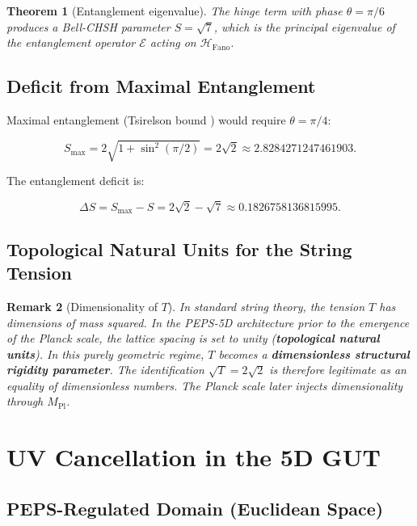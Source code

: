 \documentclass[12pt]{article}
\newtheorem{theorem}{Theorem}[section]
\newtheorem{remark}[theorem]{Remark}
\begin{document}
\begin{theorem}[Entanglement eigenvalue]
The hinge term with phase \(\theta = \pi/6\) produces a Bell-CHSH parameter \(S = \sqrt{7}\), which is the principal eigenvalue of the entanglement operator \(\mathcal{E}\) acting on \(\mathcal{H}_{\text{Fano}}\).
\end{theorem}

\subsection{Deficit from Maximal Entanglement}

Maximal entanglement (Tsirelson bound \cite{cirelson1980}) would require \(\theta = \pi/4\):

\begin{equation}
S_{\max} = 2\sqrt{1 + \sin^2(\pi/2)} = 2\sqrt{2} \approx 2.8284271247461903 .
\label{eq:S_max}
\end{equation}

The entanglement deficit is:

\begin{equation}
\boxed{\Delta S = S_{\max} - S = 2\sqrt{2} - \sqrt{7} \approx 0.1826758136815995 .}
\label{eq:deficit}
\end{equation}

\subsection{Topological Natural Units for the String Tension}

\begin{remark}[Dimensionality of \(T\)]
In standard string theory, the tension \(T\) has dimensions of mass squared. In the PEPS-5D architecture prior to the emergence of the Planck scale, the lattice spacing is set to unity (\textbf{topological natural units}). In this purely geometric regime, \(T\) becomes a \textbf{dimensionless structural rigidity parameter}. The identification \(\sqrt{T} = 2\sqrt{2}\) is therefore legitimate as an equality of dimensionless numbers. The Planck scale later injects dimensionality through \(M_{\text{Pl}}\).
\end{remark}

\section{UV Cancellation in the 5D GUT}

\subsection{PEPS-Regulated Domain (Euclidean Space)}
\end{document}
